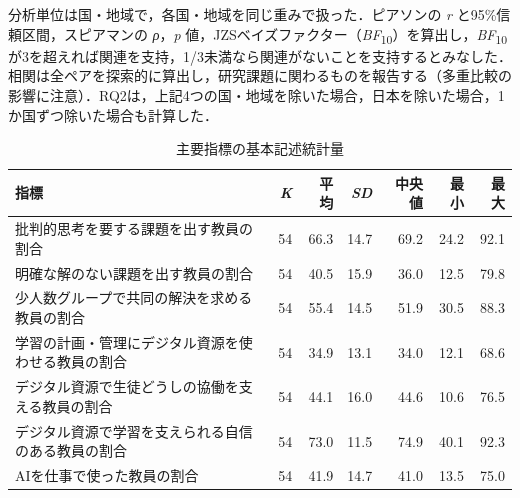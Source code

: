 \documentclass[a4paper,10pt,twocolumn]{ltjsarticle}
\begin{document}
分析単位は国・地域で，各国・地域を同じ重みで扱った．ピアソンの \textit{r} と95\%信頼区間，スピアマンの \textit{ρ}，\textit{p} 値，JZSベイズファクター（\textit{BF}\textsubscript{10}）を算出し，\textit{BF}\textsubscript{10}が3を超えれば関連を支持，1/3未満なら関連がないことを支持するとみなした．相関は全ペアを探索的に算出し，研究課題に関わるものを報告する（多重比較の影響に注意）．RQ2は，上記4つの国・地域を除いた場合，日本を除いた場合，1か国ずつ除いた場合も計算した．
\begin{table}[!t]
\caption{主要指標の基本記述統計量}
\centering\small
\begin{tabular}{>{\raggedright\arraybackslash}p{9.2cm}rrrrrr}
\toprule
指標 & \textit{K} & 平均 & \textit{SD} & 中央値 & 最小 & 最大 \\
\midrule
批判的思考を要する課題を出す教員の割合 & 54 & 66.3 & 14.7 & 69.2 & 24.2 & 92.1 \\
明確な解のない課題を出す教員の割合 & 54 & 40.5 & 15.9 & 36.0 & 12.5 & 79.8 \\
少人数グループで共同の解決を求める教員の割合 & 54 & 55.4 & 14.5 & 51.9 & 30.5 & 88.3 \\
学習の計画・管理にデジタル資源を使わせる教員の割合 & 54 & 34.9 & 13.1 & 34.0 & 12.1 & 68.6 \\
デジタル資源で生徒どうしの協働を支える教員の割合 & 54 & 44.1 & 16.0 & 44.6 & 10.6 & 76.5 \\
デジタル資源で学習を支えられる自信のある教員の割合 & 54 & 73.0 & 11.5 & 74.9 & 40.1 & 92.3 \\
AIを仕事で使った教員の割合 & 54 & 41.9 & 14.7 & 41.0 & 13.5 & 75.0 \\
\bottomrule
\end{tabular}
\par{}
\end{table}
\end{document}
